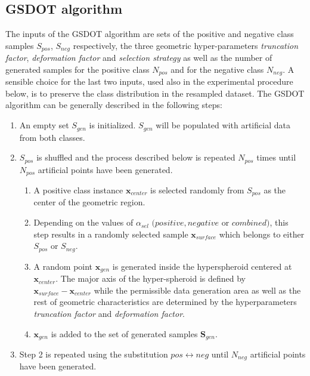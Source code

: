 \subsection{GSDOT algorithm}
\label{algorithm}

The inputs of the GSDOT algorithm are sets of the positive and negative class samples \( S_{pos} \), \( S_{neg} \) respectively, the three geometric hyper-parameters \textit{truncation factor}, \textit{deformation factor} and \textit{selection strategy} as well as the number of generated samples for the positive class \(N_{pos} \) and for the negative class \( N_{neg} \). A sensible choice for the last two inputs, used also in the experimental procedure below, is to preserve the class distribution in the resampled dataset. The GSDOT algorithm can be generally described in the following steps:

\begin{enumerate}

\renewcommand{\labelenumii}{\theenumii}
\renewcommand{\theenumii}{\theenumi.\arabic{enumii}.}

	\item An empty set \( S_{gen} \) is initialized. \( S_{gen} \) will be populated with artificial data from both classes.

	\item \( S_{pos} \) is shuffled and the process described below is repeated \( N_{pos} \) times until \( N_{pos} \) artificial points have been generated.

	\begin{enumerate}

		\item A positive class instance \( \textbf{x}_{center} \) is selected randomly from \( S_{pos} \) as the center of the geometric region.

		\item Depending on the values of \( \alpha_{sel} \) \( (positive, negative \) or \( combined) \), this step results in a randomly selected sample \(\textbf{x}_{surface} \) which belongs to either \( S_{pos} \) or \( S_{neg} \).

		\item A random point \(\textbf{x}_{gen} \) is generated inside the hyperspheroid centered at \( \textbf{x}_{center} \). The major axis of the hyper-spheroid is defined by \( \textbf{x}_{surface} - \textbf{x}_{center} \) while the permissible data generation area as well as the rest of geometric characteristics are determined by the hyperparameters \textit{truncation factor} and \textit{deformation factor}.

		\item \( \textbf{x}_{gen} \) is added to the set of generated samples
		\( \textbf{S}_{gen} \).
	
	\end{enumerate}

	\item Step 2 is repeated using the substitution \( pos \leftrightarrow neg \) until \( N_{neg} \) artificial points have been generated.

\end{enumerate}

